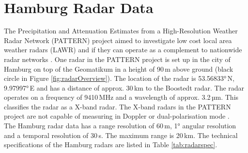 \documentclass[11pt,twoside,a4paper,fleqn,x11names]{report}
\numberwithin{equation}{chapter}
\numberwithin{figure}{chapter}
\numberwithin{table}{chapter}
\begin{document}
\section{Hamburg Radar Data}
The Precipitation and Attenuation Estimates from a High-Resolution Weather Radar Network (PATTERN) project aimed to investigate low cost local area weather radars (LAWR) and if they can operate as a complement to nationwide radar networks \citep{Lengfeld2014}. One radar in the PATTERN project is set up in the city of Hamburg on top of the Geomatikum in a height of 90\,m above ground (black circle in Figure \ref{fig:radarOverview}). The location of the radar is 53.56833°\,N, 9.97997°\,E and has a distance of approx. 30\,km to the Boostedt radar. The radar operates on a frequency of 9410\,MHz and a wavelength of approx. 3.2\,µm. This classifies the radar as a X-band radar. The X-band radars in the PATTERN project are not capable of measuring in Doppler or dual-polarisation mode \citep{Lengfeld2014}.\\
The Hamburg radar data has a range resolution of 60\,m, 1° angular resolution and a temporal resolution of 30\,s. The maximum range is 20\,km. The technical specifications of the Hamburg radars are listed in Table \ref{tab:radarspec}.
\end{document}

